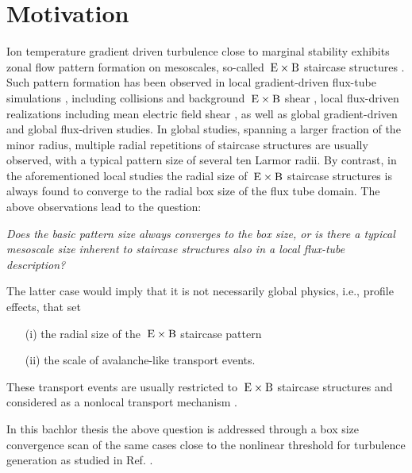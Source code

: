 
\chapter{Motivation}
\label{chap:motivation}

\thispagestyle{empty}
\newpage

Ion temperature gradient driven turbulence close to marginal stability exhibits zonal flow pattern formation on mesoscales, so-called $\mathrm{\:E}\times\mathrm{B}$ staircase structures \cite{Pradalier2010}.
Such pattern formation has been observed in local gradient-driven flux-tube simulations \cite{Peeters2016, Rath2021}, including collisions \cite{Weikl2017} and background $\mathrm{\:E}\times\mathrm{B}$ shear \cite{Rath2021}, local flux-driven realizations including mean electric field shear \cite{Seiferling2019}, as well as global gradient-driven \cite{McMillan2009, Villard2013, Seo2022} and global flux-driven \cite{Pradalier2010, Pradalier2015, Wang2020, Kim2022, Kishimoto2023} studies. 
In global studies, spanning a larger fraction of the minor radius, multiple radial repetitions of staircase structures are usually observed, with a typical pattern size of several ten Larmor radii.
By contrast, in the aforementioned local studies the radial size of $\mathrm{\:E}\times\mathrm{B}$ staircase structures is always found to converge to the radial box size of the flux tube domain.
The above observations lead to the question: \bigskip


\textit{Does the basic pattern size always converges to the box size, or is there a typical mesoscale size inherent to staircase structures also in a local flux-tube description?}\bigskip

The latter case would imply that it is not necessarily global physics, i.e., profile effects, that set 
\begin{itemize}
	\item[(i)] the radial size of the $\mathrm{\:E}\times\mathrm{B}$ staircase pattern
	\item[(ii)] the scale of avalanche-like transport events.
\end{itemize}
These transport events are usually restricted to $\mathrm{\:E}\times\mathrm{B}$ staircase structures and considered as a nonlocal transport mechanism \cite{Pradalier2010}. \bigskip

In this bachlor thesis the above question is addressed through a box size convergence scan of the same cases close to the nonlinear threshold for turbulence generation as studied in Ref. .